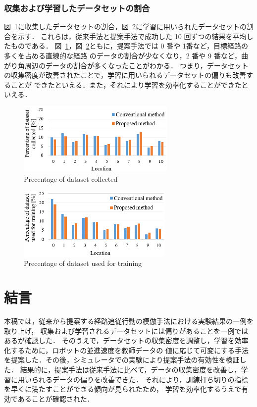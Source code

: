 \documentclass{jarticle}
\renewcommand{\figurename}{図~}
\newcommand{\figref}[1]{\figurename\ref{#1}}
\begin{document}
\subsubsection{収集および学習したデータセットの割合}
\figref{fig:12}に収集したデータセットの割合，\figref{fig:13}に学習に用いられたデータセットの割合を示す．
これらは，従来手法と提案手法で成功した 10 回ずつの結果を平均したものである．
\figref{fig:12}，\figref{fig:13}ともに，提案手法では 0 番や 1番など，目標経路の多くを占める直線的な経路
のデータの割合が少なくなり，2 番や 9 番など，曲がり角周辺のデータの割合が多くなったことがわかる．
つまり，データセットの収集密度が改善されたことで，学習に用いられるデータセットの偏りも改善することが
できたといえる．また，それにより学習を効率化することができたといえる．

\begin{figure}[h!]
  \centering
   \includegraphics[height=35mm]{./png/dataset_pro2.png}
   \caption{Precentage of dataset collected}
   \label{fig:12}
\end{figure}

\begin{figure}[h!]
  \centering
   \includegraphics[height=35mm]{./png/gaku_pro2.png}
   \caption{Precentage of dataset used for training}
   \label{fig:13}
\end{figure}



\section{結言}
本稿では，従来から提案する経路追従行動の模倣手法における実験結果の一例を取り上げ，
収集および学習されるデータセットには偏りがあることを一例ではあるが確認した．
そのうえで，データセットの収集密度を調整し，学習を効率化するために，ロボットの並進速度を教師データの
値に応じて可変にする手法を提案した．その後，シミュレータでの実験により提案手法の有効性を検証した．
結果的に，提案手法は従来手法に比べて，データの収集密度を改善し，学習に用いられるデータの偏りを改善できた．
それにより，訓練打ち切りの指標を早くに満たすことができる傾向が見られたため，
学習を効率化するうえで有効であることが確認された．\\
\end{document}
